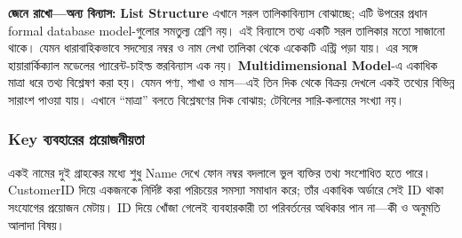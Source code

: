 \textbf{জেনে রাখো—অন্য বিন্যাস:}
\textbf{List Structure} এখানে সরল তালিকাবিন্যাস বোঝাচ্ছে; এটি উপরের প্রধান formal database model-গুলোর সমতুল্য শ্রেণি নয়। এই বিন্যাসে তথ্য একটি সরল তালিকার মতো সাজানো থাকে। যেমন ধারাবাহিকভাবে সদস্যের নম্বর ও নাম লেখা তালিকা থেকে একেকটি এন্ট্রি পড়া যায়। এর সঙ্গে হায়ারার্কিক্যাল মডেলের প্যারেন্ট-চাইল্ড স্তরবিন্যাস এক নয়। \textbf{Multidimensional Model}-এ একাধিক মাত্রা ধরে তথ্য বিশ্লেষণ করা হয়। যেমন পণ্য, শাখা ও মাস---এই তিন দিক থেকে বিক্রয় দেখলে একই তথ্যের বিভিন্ন সারাংশ পাওয়া যায়। এখানে ``মাত্রা'' বলতে বিশ্লেষণের দিক বোঝায়; টেবিলের সারি-কলামের সংখ্যা নয়।

\subsubsection{Key ব্যবহারের প্রয়োজনীয়তা}
একই নামের দুই গ্রাহকের মধ্যে শুধু Name দেখে ফোন নম্বর বদলালে ভুল ব্যক্তির তথ্য সংশোধিত হতে পারে। CustomerID দিয়ে একজনকে নির্দিষ্ট করা পরিচয়ের সমস্যা সমাধান করে; তাঁর একাধিক অর্ডারে সেই ID থাকা সংযোগের প্রয়োজন মেটায়। ID দিয়ে খোঁজা গেলেই ব্যবহারকারী তা পরিবর্তনের অধিকার পান না—কী ও অনুমতি আলাদা বিষয়।

